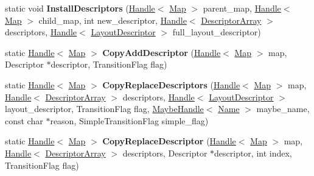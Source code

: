 \begin{DoxyCompactItemize}
\item 
static void {\bfseries Install\+Descriptors} (\hyperlink{classv8_1_1internal_1_1_handle}{Handle}$<$ \hyperlink{classv8_1_1internal_1_1_map}{Map} $>$ parent\+\_\+map, \hyperlink{classv8_1_1internal_1_1_handle}{Handle}$<$ \hyperlink{classv8_1_1internal_1_1_map}{Map} $>$ child\+\_\+map, int new\+\_\+descriptor, \hyperlink{classv8_1_1internal_1_1_handle}{Handle}$<$ \hyperlink{classv8_1_1internal_1_1_descriptor_array}{Descriptor\+Array} $>$ descriptors, \hyperlink{classv8_1_1internal_1_1_handle}{Handle}$<$ \hyperlink{classv8_1_1internal_1_1_layout_descriptor}{Layout\+Descriptor} $>$ full\+\_\+layout\+\_\+descriptor)\hypertarget{classv8_1_1internal_1_1_map_a1c1b6c3edfa864e9886f5216bf9d9a34}{}\label{classv8_1_1internal_1_1_map_a1c1b6c3edfa864e9886f5216bf9d9a34}

\item 
static \hyperlink{classv8_1_1internal_1_1_handle}{Handle}$<$ \hyperlink{classv8_1_1internal_1_1_map}{Map} $>$ {\bfseries Copy\+Add\+Descriptor} (\hyperlink{classv8_1_1internal_1_1_handle}{Handle}$<$ \hyperlink{classv8_1_1internal_1_1_map}{Map} $>$ map, Descriptor $\ast$descriptor, Transition\+Flag flag)\hypertarget{classv8_1_1internal_1_1_map_ac2a021eafd4b8bb93fcd86becc2dde95}{}\label{classv8_1_1internal_1_1_map_ac2a021eafd4b8bb93fcd86becc2dde95}

\item 
static \hyperlink{classv8_1_1internal_1_1_handle}{Handle}$<$ \hyperlink{classv8_1_1internal_1_1_map}{Map} $>$ {\bfseries Copy\+Replace\+Descriptors} (\hyperlink{classv8_1_1internal_1_1_handle}{Handle}$<$ \hyperlink{classv8_1_1internal_1_1_map}{Map} $>$ map, \hyperlink{classv8_1_1internal_1_1_handle}{Handle}$<$ \hyperlink{classv8_1_1internal_1_1_descriptor_array}{Descriptor\+Array} $>$ descriptors, \hyperlink{classv8_1_1internal_1_1_handle}{Handle}$<$ \hyperlink{classv8_1_1internal_1_1_layout_descriptor}{Layout\+Descriptor} $>$ layout\+\_\+descriptor, Transition\+Flag flag, \hyperlink{classv8_1_1internal_1_1_maybe_handle}{Maybe\+Handle}$<$ \hyperlink{classv8_1_1internal_1_1_name}{Name} $>$ maybe\+\_\+name, const char $\ast$reason, Simple\+Transition\+Flag simple\+\_\+flag)\hypertarget{classv8_1_1internal_1_1_map_a6f1a74fc6db76506f245bd04502fa22c}{}\label{classv8_1_1internal_1_1_map_a6f1a74fc6db76506f245bd04502fa22c}

\item 
static \hyperlink{classv8_1_1internal_1_1_handle}{Handle}$<$ \hyperlink{classv8_1_1internal_1_1_map}{Map} $>$ {\bfseries Copy\+Replace\+Descriptor} (\hyperlink{classv8_1_1internal_1_1_handle}{Handle}$<$ \hyperlink{classv8_1_1internal_1_1_map}{Map} $>$ map, \hyperlink{classv8_1_1internal_1_1_handle}{Handle}$<$ \hyperlink{classv8_1_1internal_1_1_descriptor_array}{Descriptor\+Array} $>$ descriptors, Descriptor $\ast$descriptor, int index, Transition\+Flag flag)\hypertarget{classv8_1_1internal_1_1_map_a682d3a213e2e9b8bbbe3bffe01f652b7}{}\label{classv8_1_1internal_1_1_map_a682d3a213e2e9b8bbbe3bffe01f652b7}


\end{DoxyCompactItemize}
